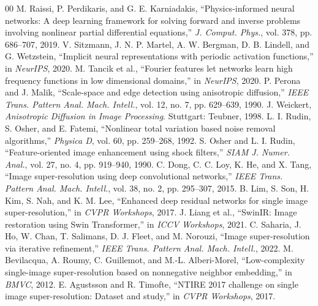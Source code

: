 \documentclass[conference]{IEEEtran}
\begin{document}
\begin{thebibliography}{00}
 M. Raissi, P. Perdikaris, and G. E. Karniadakis,
``Physics-informed neural networks: A deep learning framework for solving
forward and inverse problems involving nonlinear partial differential
equations,'' \textit{J. Comput. Phys.}, vol. 378, pp. 686--707, 2019.
 V. Sitzmann, J. N. P. Martel, A. W. Bergman,
D. B. Lindell, and G. Wetzstein, ``Implicit neural representations with
periodic activation functions,'' in \textit{NeurIPS}, 2020.
 M. Tancik et al., ``Fourier features let
networks learn high frequency functions in low dimensional domains,''
in \textit{NeurIPS}, 2020.
 P. Perona and J. Malik, ``Scale-space and edge
detection using anisotropic diffusion,'' \textit{IEEE Trans. Pattern
Anal. Mach. Intell.}, vol. 12, no. 7, pp. 629--639, 1990.
 J. Weickert, \textit{Anisotropic Diffusion in Image
Processing}. Stuttgart: Teubner, 1998.
 L. I. Rudin, S. Osher, and E. Fatemi, ``Nonlinear total
variation based noise removal algorithms,'' \textit{Physica D}, vol. 60,
pp. 259--268, 1992.
 S. Osher and L. I. Rudin, ``Feature-oriented image
enhancement using shock filters,'' \textit{SIAM J. Numer. Anal.}, vol. 27,
no. 4, pp. 919--940, 1990.
 C. Dong, C. C. Loy, K. He, and X. Tang,
``Image super-resolution using deep convolutional networks,''
\textit{IEEE Trans. Pattern Anal. Mach. Intell.}, vol. 38, no. 2,
pp. 295--307, 2015.
 B. Lim, S. Son, H. Kim, S. Nah, and K. M. Lee,
``Enhanced deep residual networks for single image super-resolution,''
in \textit{CVPR Workshops}, 2017.
 J. Liang et al., ``SwinIR: Image restoration
using Swin Transformer,'' in \textit{ICCV Workshops}, 2021.
 C. Saharia, J. Ho, W. Chan, T. Salimans,
D. J. Fleet, and M. Norouzi, ``Image super-resolution via iterative
refinement,'' \textit{IEEE Trans. Pattern Anal. Mach. Intell.}, 2022.
 M. Bevilacqua, A. Roumy, C. Guillemot, and
M.-L. Alberi-Morel, ``Low-complexity single-image super-resolution
based on nonnegative neighbor embedding,'' in \textit{BMVC}, 2012.
 E. Agustsson and R. Timofte,
``NTIRE 2017 challenge on single image super-resolution: Dataset and
study,'' in \textit{CVPR Workshops}, 2017.
\end{thebibliography}
\end{document}
